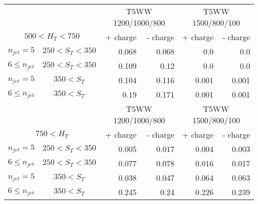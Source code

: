 \documentclass[12pt]{paper}
\begin{document}
\begin{sidewaystable}[ht]
\begin{center}
\begin{tabular}{cc|r|r|r|r}
& & \multicolumn{2}{c|}{T5WW 1200/1000/800}&\multicolumn{2}{c}{T5WW 1500/800/100}\\
\multicolumn{2}{c|}{$500< H_{T}< 750$} & + charge & - charge & + charge & - charge \\\hline
$n_{jet}=5$ & $250< S_{T}< 350$ & 0.068 & 0.068 & 0.0 & 0.0\\
$6\leq n_{jet}$ & $250< S_{T}< 350$ & 0.109 & 0.12 & 0.0 & 0.0\\
$n_{jet}=5$ & $350< S_{T}$ & 0.104 & 0.116 & 0.001 & 0.001\\
$6\leq n_{jet}$ & $350< S_{T}$ & 0.19 & 0.171 & 0.001 & 0.001\\
\hline
& & \multicolumn{2}{c|}{T5WW 1200/1000/800}&\multicolumn{2}{c}{T5WW 1500/800/100}\\
\multicolumn{2}{c|}{$750< H_{T}$} & + charge & - charge & + charge & - charge \\\hline
$n_{jet}=5$ & $250< S_{T}< 350$ & 0.005 & 0.017 & 0.004 & 0.003\\
$6\leq n_{jet}$ & $250< S_{T}< 350$ & 0.077 & 0.078 & 0.016 & 0.017\\
$n_{jet}=5$ & $350< S_{T}$ & 0.038 & 0.047 & 0.064 & 0.063\\
$6\leq n_{jet}$ & $350< S_{T}$ & 0.245 & 0.24 & 0.226 & 0.239\\
\end{tabular}
\end{center}
\end{sidewaystable}

%
%
%
\end{document}
